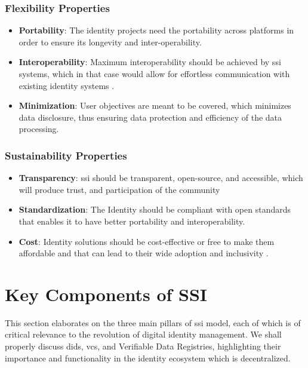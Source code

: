 \subsubsection{Flexibility Properties}

\begin{itemize}
    \item \textbf{Portability}: The identity projects need the portability across platforms in order to ensure its longevity and inter-operability.
    \item \textbf{Interoperability}: Maximum interoperability should be achieved by \gls{ssi} systems, which in that case would allow for effortless communication with 
    existing identity systems \cite{9869618}. 
    \item \textbf{Minimization}: User objectives are meant to be covered, which minimizes data disclosure, thus ensuring data protection and efficiency of the data processing.
\end{itemize}

\subsubsection{Sustainability Properties}

\begin{itemize}
    \item \textbf{Transparency}: \gls{ssi} should be transparent, open-source, and accessible, which will produce trust, and participation of the community
    \item \textbf{Standardization}: The Identity should be compliant with open standards that enables it to have better portability and interoperability.
    \item \textbf{Cost}: Identity solutions should be cost-effective or free to make them affordable and that can lead to their wide adoption and inclusivity \cite{9869618}.
\end{itemize}

\section{Key Components of SSI} \label{sec:4.3}

This section elaborates on the three main pillars of \gls{ssi} model, each of which is of critical relevance to the revolution of digital identity management. We shall properly 
discuss \gls{did}s, \gls{vc}s, and Verifiable Data Registries, highlighting their importance and functionality in the identity 
ecosystem which is decentralized.

